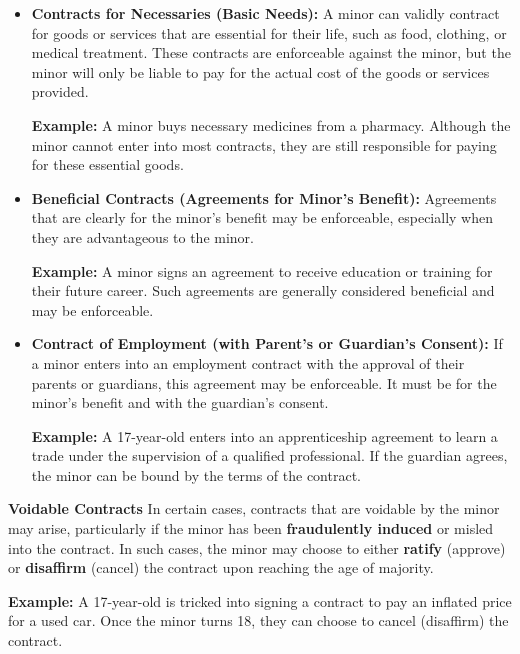 \documentclass[12pt,a4paper]{book}
\begin{document}
\begin{itemize}
    \item \textbf{Contracts for Necessaries (Basic Needs):}  
    A minor can validly contract for goods or services that are essential for their life, such as food, clothing, or medical treatment. These contracts are enforceable against the minor, but the minor will only be liable to pay for the actual cost of the goods or services provided.

    \textbf{Example:}  
    A minor buys necessary medicines from a pharmacy. Although the minor cannot enter into most contracts, they are still responsible for paying for these essential goods.

    \item \textbf{Beneficial Contracts (Agreements for Minor's Benefit):}  
    Agreements that are clearly for the minor’s benefit may be enforceable, especially when they are advantageous to the minor.

    \textbf{Example:}  
    A minor signs an agreement to receive education or training for their future career. Such agreements are generally considered beneficial and may be enforceable.

    \item \textbf{Contract of Employment (with Parent's or Guardian's Consent):}  
    If a minor enters into an employment contract with the approval of their parents or guardians, this agreement may be enforceable. It must be for the minor’s benefit and with the guardian’s consent.

    \textbf{Example:}  
    A 17-year-old enters into an apprenticeship agreement to learn a trade under the supervision of a qualified professional. If the guardian agrees, the minor can be bound by the terms of the contract.

\end{itemize}

\vspace{0.3cm}

\textbf{Voidable Contracts}  
In certain cases, contracts that are voidable by the minor may arise, particularly if the minor has been \textbf{fraudulently induced} or misled into the contract. In such cases, the minor may choose to either \textbf{ratify} (approve) or \textbf{disaffirm} (cancel) the contract upon reaching the age of majority.

\textbf{Example:}  
A 17-year-old is tricked into signing a contract to pay an inflated price for a used car. Once the minor turns 18, they can choose to cancel (disaffirm) the contract.
\end{document}
